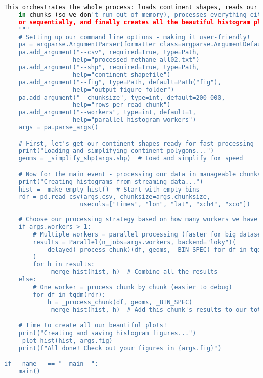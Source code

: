 \begin{lstlisting}[language=Python, caption=Histogram Generation Algorithm, label=alg:step03_histos, breaklines=true]
    This orchestrates the whole process: loads continent shapes, reads our methane data
    in chunks (so we don't run out of memory), processes everything either in parallel
    or sequentially, and finally creates all the beautiful histogram plots.
    """
    # Setting up our command line options - making it user-friendly!
    pa = argparse.ArgumentParser(formatter_class=argparse.ArgumentDefaultsHelpFormatter)
    pa.add_argument("--csv", required=True, type=Path, 
                   help="processed methane_all02.txt")
    pa.add_argument("--shp", required=True, type=Path, 
                   help="continent shapefile")
    pa.add_argument("--fig", type=Path, default=Path("fig"), 
                   help="output figure folder")
    pa.add_argument("--chunksize", type=int, default=200_000, 
                   help="rows per read chunk")
    pa.add_argument("--workers", type=int, default=1, 
                   help="parallel histogram workers")
    args = pa.parse_args()

    # First, let's get our continent shapes ready for fast processing
    print("Loading and simplifying continent polygons...")
    geoms = _simplify_shp(args.shp)  # Load and simplify for speed

    # Now for the main event - processing our data in manageable chunks
    print("Creating histograms from streaming data...")
    hist = _make_empty_hist()  # Start with empty bins
    rdr = pd.read_csv(args.csv, chunksize=args.chunksize, 
                     usecols=["times", "lon", "lat", "xch4", "xco"])
    
    # Choose our processing strategy based on how many workers we have
    if args.workers > 1:
        # Multiple workers = parallel processing (faster for big datasets!)
        results = Parallel(n_jobs=args.workers, backend="loky")(
            delayed(_process_chunk)(df, geoms, _BIN_SPEC) for df in tqdm(rdr)
        )
        for h in results:
            _merge_hist(hist, h)  # Combine all the results
    else:
        # One worker = process chunk by chunk (easier to debug)
        for df in tqdm(rdr):
            h = _process_chunk(df, geoms, _BIN_SPEC)
            _merge_hist(hist, h)  # Add this chunk's results to our totals

    # Time to create all our beautiful plots!
    print("Creating and saving histogram figures...")
    _plot_hist(hist, args.fig)
    print(f"All done! Check out your figures in {args.fig}")

if __name__ == "__main__":
    main()
\end{lstlisting}

